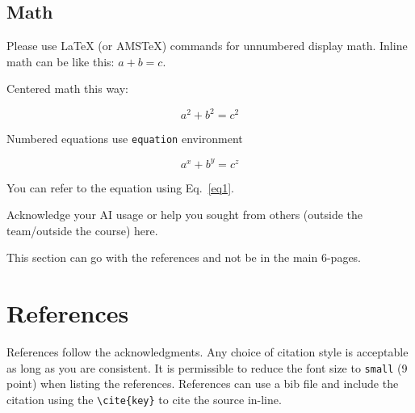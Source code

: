 \documentclass{article}
\begin{document}
\subsection{Math}
Please use LaTeX (or AMSTeX) commands for unnumbered display math. 
Inline math can be like this: $a + b = c$.

Centered math this way:

$$a^2 + b^2 = c^2$$

Numbered equations use \verb+equation+ environment

\begin{equation}
a^x + b^y = c^z
\label{eq1}
\end{equation}

You can refer to the equation using Eq.~\ref{eq1}.


\begin{ack}
Acknowledge your AI usage or help you sought from others (outside the team/outside the course) here.

This section can go with the references and not be in the main 6-pages.
\end{ack} 

\section*{References}


References follow the acknowledgments. Any choice of citation style is acceptable as long as you are
consistent. It is permissible to reduce the font size to \verb+small+ (9 point)
when listing the references. References can use a bib file and include the citation using the \verb+\cite{key}+ to cite the source in-line.
\end{document}
